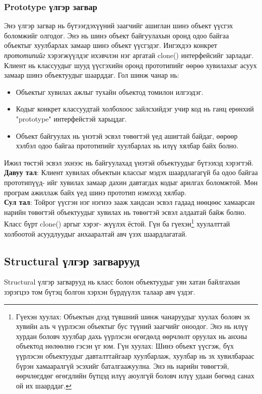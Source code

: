 \subsubsection{Prototype үлгэр загвар}
\quad \quad Энэ үлгэр загвар нь бүтээгдэхүүний заагчийг ашиглан шинэ объект үүсгэх боломжийг олгодог. Энэ нь шинэ объект байгуулахын оронд одоо байгаа объектыг хуулбарлах замаар шинэ объект үүсгэдэг. Ингэхдээ конкрет \textit{прототипийг} хэрэгжүүлдэг ихэвчлэн нэг аргатай clone() интерфейсийг зарладаг. Клиент нь классуудыг шууд үүсгэхийн оронд прототипийг өөрөө хувилахыг асуух замаар шинэ объектуудыг шаарддаг. Гол шинж чанар нь:
\begin{itemize}
	\item Объектыг хувилах ажлыг тухайн объектод томилон илгээдэг.
	\item Кодыг конкрет классуудтай холбохоос зайлсхийдэг учир код нь ганц ерөнхий "prototype" интерфейстэй харьцдаг.
	\item Объект байгуулах нь үнэтэй эсвэл төвөгтэй үед ашигтай байдаг, өөрөөр хэлбэл одоо байгаа прототипийг хуулбарлах нь илүү хялбар байх болно.
\end{itemize}
Ижил төстэй эсвэл эхнээс нь байгуулахад үнэтэй объектуудыг бүтээхэд хэрэгтэй.\\
\textbf{Давуу тал}: Клиент хувилах объектын классыг мэдэх шаардлагагүй ба одоо байгаа прототипүүд- ийг хувилах замаар дахин давтагдах кодыг арилгах боломжтой. Мөн програм ажиллаж байх үед шинэ прототип нэмэхэд хялбар.\\
\textbf{Сул тал}: Тойрог үүсгэн нэг нэгнээ зааж хандсан эсвэл гадаад нөөцөөс хамаарсан нарийн төвөгтэй объектуудыг хувилах нь төвөгтэй эсвэл алдаатай байж болно. Класс бүрт  clone()  аргыг хэрэг- жүүлэх ёстой. Гүн ба гүехэн\footnote{
	Гүехэн хуулах: Объектын дээд түвшний шинж чанаруудыг хуулах боловч эх хувийн аль ч үүрлэсэн объектыг бус түүний заагчийг оноодог. Энэ нь илүү хурдан боловч хуулбар дахь үүрлэсэн өгөгдөлд өөрчлөлт оруулах нь анхны объектод нөлөөлнө гэсэн үг юм.
	Гүн хуулах: Шинэ объект үүсгэж, бүх үүрлэсэн объектуудыг давталттайгаар хуулбарлаж, хуулбар нь эх хувилбараас бүрэн хамааралгүй эсэхийг баталгаажуулна. Энэ нь нарийн төвөгтэй, өөрчлөгддөг өгөгдлийн бүтцэд илүү аюулгүй боловч илүү удаан бөгөөд санах ой их шаарддаг.
} хуулалттай холбоотой асуудлуудыг анхааралтай авч үзэх шаардлагатай.

\subsection{Structural үлгэр загварууд}
Structural үлгэр загварууд нь класс болон объектуудыг уян хатан байлгахын зэрэгцээ том бүтэц болгон хэрхэн бүрдүүлэх талаар авч үздэг.




